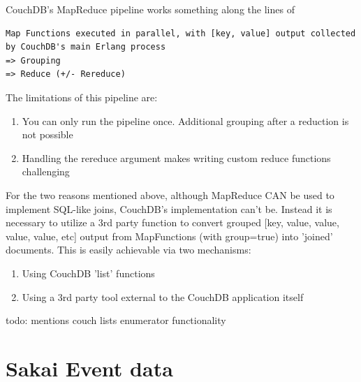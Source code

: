 CouchDB's MapReduce pipeline works something along the lines of

\begin{verbatim}
Map Functions executed in parallel, with [key, value] output collected by CouchDB's main Erlang process
=> Grouping
=> Reduce (+/- Rereduce)
\end{verbatim}

The limitations of this pipeline are:

\begin{enumerate}
    \item You can only run the pipeline once. Additional grouping after a reduction is not possible
    \item Handling the rereduce argument makes writing custom reduce functions challenging
\end{enumerate}

For the two reasons mentioned above, although MapReduce CAN be used to implement SQL-like joins, CouchDB's implementation can't be. Instead it is necessary to utilize a 3rd party function to convert grouped [key, value, value, value, value, etc] output from MapFunctions (with group=true) into 'joined' documents. This is easily achievable via two mechanisms:

\begin{enumerate}
    \item Using CouchDB 'list' functions
    \item Using a 3rd party tool external to the CouchDB application itself
\end{enumerate}

todo: mentions couch lists enumerator functionality


\section{Sakai Event data}

